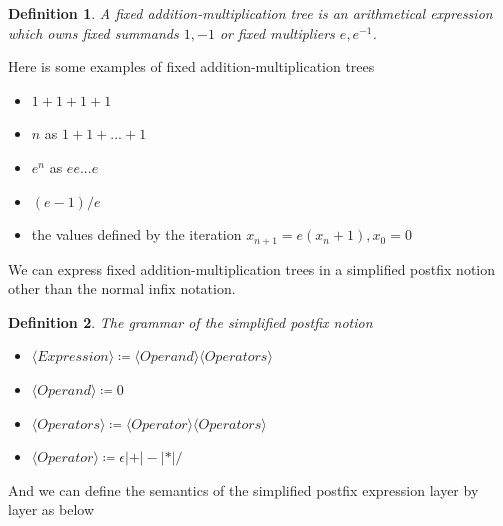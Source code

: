 \documentclass{article}
\newtheorem{definition}{Definition}
\begin{document}
\begin{definition}
A fixed addition-multiplication tree is an arithmetical expression which owns fixed summands $1, -1$
or fixed multipliers $e, e^{-1}$.
\end{definition}

Here is some examples of fixed addition-multiplication trees
\begin{itemize}
    \item $1 + 1 + 1 + 1$
    \item $n$ as $1 + 1 + ... + 1$
    \item $e^n$ as $e e ... e$
    \item $(e - 1) / e $
    \item the values defined by the iteration $x_{n+1} = e (x_n + 1), x_0 = 0$
\end{itemize}

We can express fixed addition-multiplication trees in a simplified postfix notion other than the normal infix notation.

\begin{definition}
    The grammar of the simplified postfix notion
    \begin{itemize}
    \item $\langle Expression \rangle \coloneqq \langle Operand \rangle \langle Operators \rangle$
    \item $\langle Operand \rangle \coloneqq 0$
    \item $\langle Operators \rangle \coloneqq \langle Operator \rangle \langle Operators \rangle$
    \item $\langle Operator \rangle \coloneqq \epsilon | + | - | * | /$
    \end{itemize}
\end{definition}

And we can define the semantics of the simplified postfix expression layer by layer as below
\end{document}
